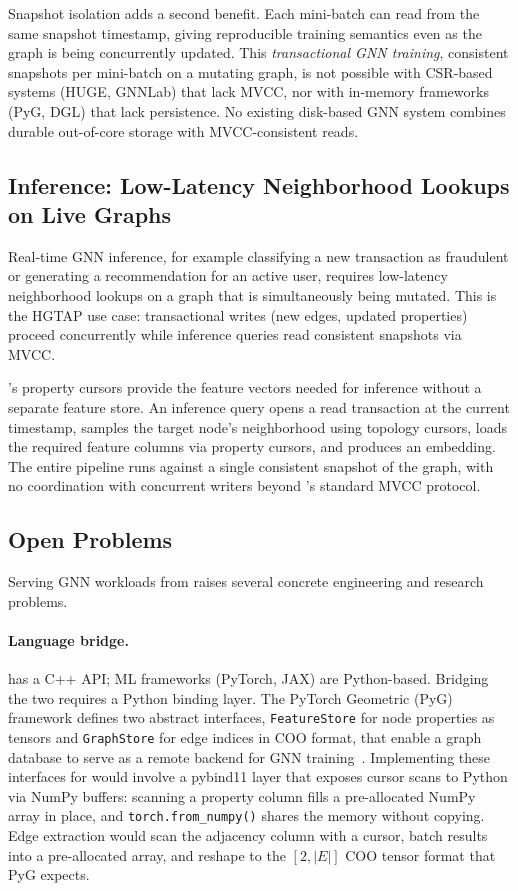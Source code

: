 Snapshot isolation adds a second benefit.
Each mini-batch can read from the same \wt{} snapshot timestamp, giving reproducible training semantics even as the graph is being concurrently updated.
This \emph{transactional GNN training}, consistent snapshots per mini-batch on a mutating graph, is not possible with CSR-based systems (HUGE, GNNLab) that lack MVCC, nor with in-memory frameworks (PyG, DGL) that lack persistence.
No existing disk-based GNN system combines durable out-of-core storage with MVCC-consistent reads.


\subsection{Inference: Low-Latency Neighborhood Lookups on Live Graphs}
\label{sec:future:gnn:inference}

Real-time GNN inference, for example classifying a new transaction as fraudulent or generating a recommendation for an active user, requires low-latency neighborhood lookups on a graph that is simultaneously being mutated.
This is the \ac{HGTAP} use case: transactional writes (new edges, updated properties) proceed concurrently while inference queries read consistent snapshots via MVCC.

\project{}'s property cursors provide the feature vectors needed for inference without a separate feature store.
An inference query opens a read transaction at the current timestamp, samples the target node's neighborhood using topology cursors, loads the required feature columns via property cursors, and produces an embedding.
The entire pipeline runs against a single consistent snapshot of the graph, with no coordination with concurrent writers beyond \wt{}'s standard MVCC protocol.


\subsection{Open Problems}
\label{sec:future:gnn:open}

Serving GNN workloads from \project{} raises several concrete engineering and research problems.

\paragraph{Language bridge.}
\project{} has a C++ API; ML frameworks (PyTorch, JAX) are Python-based.
Bridging the two requires a Python binding layer.
The PyTorch Geometric (PyG) framework defines two abstract interfaces, \texttt{FeatureStore} for node properties as tensors and \texttt{GraphStore} for edge indices in COO format, that enable a graph database to serve as a remote backend for GNN training~\cite{chen2023kuzu-pyg-backend}.
Implementing these interfaces for \project{} would involve a pybind11 layer that exposes \wt{} cursor scans to Python via NumPy buffers: scanning a property column fills a pre-allocated NumPy array in place, and \texttt{torch.from\_numpy()} shares the memory without copying.
Edge extraction would scan the adjacency column with a \wt{} cursor, batch results into a pre-allocated array, and reshape to the $[2, |E|]$ COO tensor format that PyG expects.

